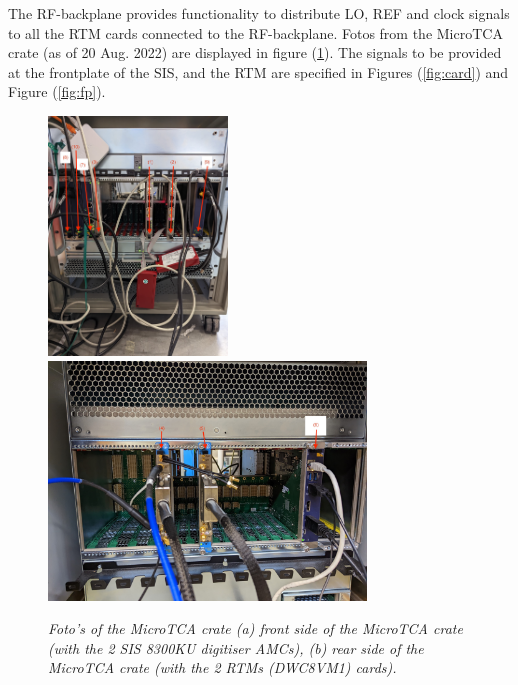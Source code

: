 \documentclass[12pt]{amsart}
\begin{document}
The RF-backplane provides functionality to distribute LO, REF and clock signals to all the RTM cards connected to the RF-backplane.
Fotos from the MicroTCA crate (as of 20 Aug. 2022) are displayed in figure (\ref{fig:foto}).
The signals to be provided at the frontplate of the SIS, and the RTM are specified in Figures (\ref{fig:card}) and Figure (\ref{fig:fp}).
\begin{figure}[htbp] %
   \centering
   \includegraphics[height=2.5in]{im/foto_front.jpg}
   \includegraphics[height=2.5in]{im/foto_rtm.jpg} 
   \caption{\em Foto's of the MicroTCA crate 
   	(a) front side of the MicroTCA crate (with the 2 SIS 8300KU digitiser AMCs),
	(b) rear side of the MicroTCA crate (with the 2 RTMs (DWC8VM1) cards).}
   \label{fig:foto}
\end{figure}
\end{document}
